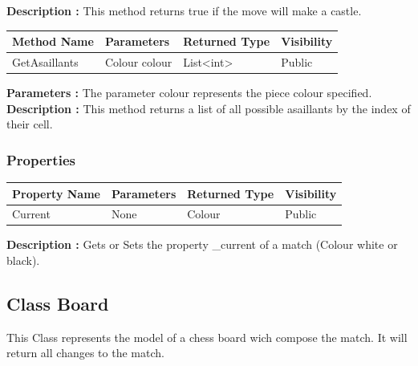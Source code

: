 \documentclass[12pt]{article}
\begin{document}
\textbf{Description :} This method returns true if the move will make a castle.

\begin{table}[H]
    \begin{tabular}{|l|l|l|l|}
    \hline
    \rowcolor[HTML]{EFEFEF} 
    \cellcolor[HTML]{EFEFEF}\textbf{Method Name} & \textbf{Parameters}     & \textbf{Returned Type} & \textbf{Visibility} \\ \hline
    GetAsaillants                                & Colour colour           & List\textless{}int\textgreater{}                   & Public              \\ \hline
    \end{tabular}
\end{table}

\textbf{Parameters :} The parameter colour represents the piece colour specified.
\textbf{Description :} This method returns a list of all possible asaillants by the index of their cell.

\subsubsection{Properties}

\begin{table}[H]
    \begin{tabular}{|l|l|l|l|}
    \hline
    \rowcolor[HTML]{EFEFEF} 
    \cellcolor[HTML]{EFEFEF}\textbf{Property Name} & \textbf{Parameters}  & \textbf{Returned Type} & \textbf{Visibility} \\ \hline
    Current                                        & None                 & Colour                 & Public              \\ \hline
    \end{tabular}
\end{table}

\textbf{Description :} Gets or Sets the property \_current of a match (Colour white or black).

\newpage


\subsection{Class Board}

This Class represents the model of a chess board wich compose the
match. It will return all changes to the match.
\end{document}
